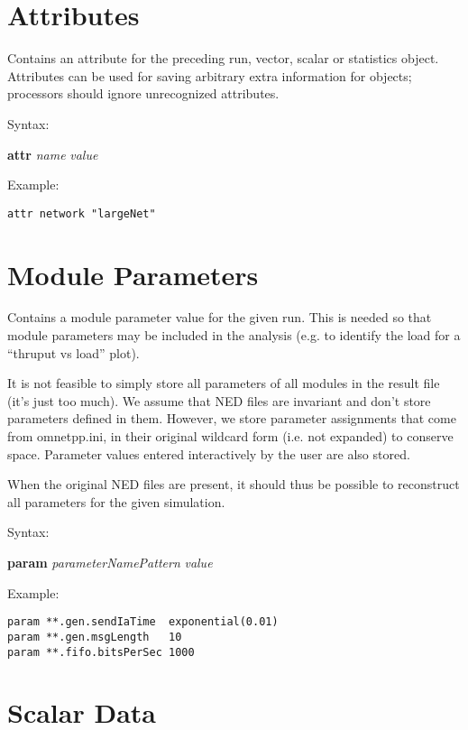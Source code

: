 \section{Attributes}

Contains an attribute for the preceding run, vector, scalar or
statistics object. Attributes can be used for saving arbitrary
extra information for objects; processors should ignore unrecognized
attributes.

Syntax:

\hspace{20mm} \textbf{attr} \textit{name} \textit{value}

Example:

\begin{verbatim}
attr network "largeNet"
\end{verbatim}



\section{Module Parameters}

Contains a module parameter value for the given run. This is needed so
that module parameters may be included in the analysis (e.g. to
identify the load for a ``thruput vs load'' plot).

It is not feasible to simply store all parameters of all modules in the
result file (it's just too much). We assume that NED files are
invariant and don't store parameters defined in them. However, we store
parameter assignments that come from omnetpp.ini, in their original
wildcard form (i.e. not expanded) to conserve space. Parameter values
entered interactively by the user are also stored.

When the original NED files are present, it should thus be possible to
reconstruct all parameters for the given simulation.

Syntax:

\hspace{20mm} \textbf{param} \textit{parameterNamePattern} \textit{value}

Example:

\begin{verbatim}
param **.gen.sendIaTime  exponential(0.01)
param **.gen.msgLength   10
param **.fifo.bitsPerSec 1000
\end{verbatim}


\section{Scalar Data}

